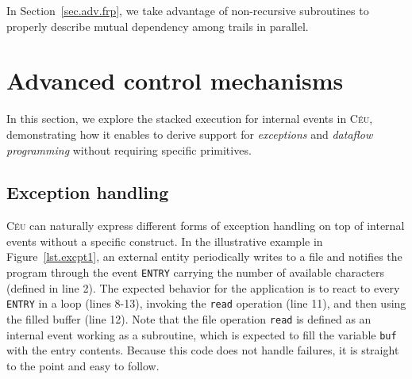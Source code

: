 \documentclass{acm_proc_article-sp}
\newcommand{\CEU}{\textsc{C\'{e}u}\xspace}
\newcommand{\code}[1] {{\small{\texttt{#1}}}}
\newcommand{\DOFIN}{\code{do-finally}\xspace}
\newcommand{\1}{\;}
\newcommand{\2}{\;\;}
\newcommand{\3}{\;\;\;}
\newcommand{\5}{\;\;\;\;\;}
\begin{document}
\begin{comment}
Regardless of the limitations, this form of subroutines is widely adopted in 
\CEU programs, given that they were designed to work with the other control 
mechanisms.
Keep in mind that the typical reactive organization of programs (awaiting an 
external stimulus, reacting to it, and going back to awaiting) does not demand 
unrestricted subroutines.
\end{comment}
In Section~\ref{sec.adv.frp}, we take advantage of non-recursive subroutines to 
properly describe mutual dependency among trails in parallel.

\section{Advanced control mechanisms}
\label{sec.adv}

In this section, we explore the stacked execution for internal events in \CEU, 
demonstrating how it enables to derive support for \emph{exceptions} and 
\emph{dataflow programming} without requiring specific primitives.

\begin{comment}
Although the described mechanisms involve thoughtful techniques, they can be 
easily abstracted with compile-time macros taking advantage of the structured 
style of \CEU%
\footnote{Our programs in \CEU make extensive use of the \emph{m4} 
preprocessor.}.
As an exception, the \DOFIN construct to be presented in 
Section~\ref{sec.adv.fin} makes slight global additions to the program tree and 
requires a dedicated syntax.
\end{comment}

\subsection{Exception handling}
\label{sec.adv.excpt}

\begin{comment}
Exception handling can be provided by specialized programming language 
constructs (e.g., \code{try-catch} blocks in Java), but also with techniques 
using standard control-flow primitives (e.g., \code{setjmp/longjmp} in $C$).
\end{comment}

\CEU can naturally express different forms of exception handling on top of 
internal events without a specific construct.
%
In the illustrative example in Figure~\ref{lst.excpt1}, an external entity 
periodically writes to a file and notifies the program through the event 
\code{ENTRY} carrying the number of available characters (defined in line 2).
The expected behavior for the application is to react to every \code{ENTRY} in 
a loop (lines 8-13), invoking the \code{read} operation (line 11), and then 
using the filled buffer (line 12).
Note that the file operation \code{read} is defined as an internal event 
working as a subroutine, which is expected to fill the variable \code{buf} with 
the entry contents.
Because this code does not handle failures, it is straight to the point and 
easy to follow.
\end{document}
